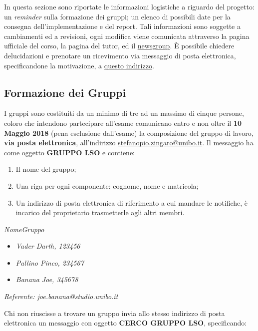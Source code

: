 
In questa sezione sono riportate le informazioni logistiche a riguardo del
progetto: un \textit{reminder} sulla formazione dei gruppi; un elenco di
possibili date per la consegna dell'implementazione e del report. Tali
informazioni sono soggette a cambiamenti ed a revisioni, ogni modifica viene
comunicata attraverso la pagina ufficiale del corso, la pagina del tutor, ed il
\href{https://www.wikibooks.org}{newsgroup}. È possibile chiedere delucidazioni
e prenotare un ricevimento via messaggio di posta elettronica, specificandone la
motivazione, a \href{mailto:stefanopio.zingaro@unibo.it}{questo indirizzo}.

\subsection{Formazione dei Gruppi}

I gruppi sono costituiti da un minimo di tre ad un massimo di cinque persone,
coloro che intendono partecipare all'esame comunicano entro e non oltre il
\textbf{10 Maggio 2018} (pena esclusione dall'esame) la composizione del gruppo
di lavoro, \textbf{via posta elettronica}, all'indirizzo
\url{stefanopio.zingaro@unibo.it}. Il messaggio ha come oggetto \textbf{GRUPPO
 LSO} e contiene:

\begin{enumerate}
 \item Il nome del gruppo;
 \item Una riga per ogni componente: cognome, nome e matricola;
 \item Un indirizzo di posta elettronica di riferimento a cui mandare le notifiche, è incarico del proprietario trasmetterle agli altri membri.
\end{enumerate}

\begin{tcolorbox}[colback=green!20!white,colframe=green!75!black,title=Email di esempio con oggetto \textbf{GRUPPO LSO}]
 \textit{NomeGruppo}
 \begin{itemize}
  \item \textit{Vader Darth, 123456}
  \item \textit{Pallino Pinco, 234567}
  \item \textit{Banana Joe, 345678}
 \end{itemize}
 \textit{Referente: joe.banana@studio.unibo.it}
\end{tcolorbox}

Chi non riuscisse a trovare un gruppo invia allo stesso indirizzo di posta
elettronica un messaggio con oggetto \textbf{CERCO GRUPPO LSO}, specificando:

